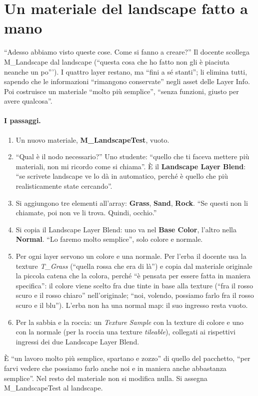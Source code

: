 \section{Un materiale del landscape fatto a mano}
\label{ue14:sec:materialetest}

``Adesso abbiamo visto queste cose. Come si fanno a creare?'' Il docente scollega
M\_Landscape dal landscape (``questa cosa che ho fatto non gli è piaciuta neanche un po''').
I quattro layer restano, ma ``fini a sé stanti''; li elimina tutti, sapendo che le
informazioni ``rimangono conservate'' negli asset delle Layer Info. Poi costruisce un
materiale ``molto più semplice'', ``senza funzioni, giusto per avere qualcosa''.

\paragraph{I passaggi.}
\begin{enumerate}
  \item Un nuovo materiale, \textbf{M\_LandscapeTest}, vuoto.
  \item ``Qual è il nodo necessario?'' Uno studente: ``quello che ti faceva mettere più
        materiali, non mi ricordo come si chiama''. È il \textbf{Landscape Layer Blend}:
        ``se scrivete landscape ve lo dà in automatico, perché è quello che più
        realisticamente state cercando''.
  \item Si aggiungono tre elementi all'array: \textbf{Grass}, \textbf{Sand}, \textbf{Rock}.
        ``Se questi non li chiamate, poi non ve li trova. Quindi, occhio.''
  \item Si copia il Landscape Layer Blend: uno va nel \textbf{Base Color}, l'altro nella
        \textbf{Normal}. ``Lo faremo molto semplice'', solo colore e normale.
  \item Per ogni layer servono un colore e una normale. Per l'erba il docente usa la
        texture \emph{T\_Grass} (``quella rossa che era di là'') e copia dal materiale
        originale la piccola catena che la colora, perché ``è pensata per essere fatta in
        maniera specifica'': il colore viene scelto fra due tinte in base alla texture (``fra
        il rosso scuro e il rosso chiaro'' nell'originale; ``noi, volendo, possiamo farlo fra
        il rosso scuro e il blu''). L'erba non ha una normal map: il suo ingresso resta vuoto.
  \item Per la sabbia e la roccia: un \emph{Texture Sample} con la texture di colore e uno
        con la normale (per la roccia una texture \emph{tileable}), collegati ai rispettivi
        ingressi dei due Landscape Layer Blend.
\end{enumerate}
È ``un lavoro molto più semplice, spartano e zozzo'' di quello del pacchetto, ``per farvi
vedere che possiamo farlo anche noi e in maniera anche abbastanza semplice''. Nel resto del
materiale non si modifica nulla. Si assegna M\_LandscapeTest al landscape.

